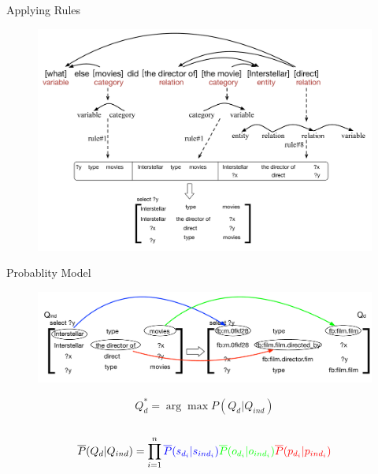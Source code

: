 \documentclass{beamer}
\begin{document}
\begin{frame}{Applying Rules}
	\begin{figure}
		\centering\includegraphics[width=1.0\textwidth]{introduction/graphUsingRules.pdf}
	\end{figure}
\end{frame}

\begin{frame}{Probablity Model}
	\begin{figure}
		\centering\includegraphics[width=1.0\textwidth]{introduction/grounding.pdf}
	\end{figure}
	$$Q^*_{d} = \arg\max P(Q_{d}|Q_{ind})$$ \\ \pause
	$$ \overline{P}(Q_{d}|Q_{ind})  =  \prod_{i=1}^n \textcolor{blue}{\overline{P}(s_{d_{i}} |s_{ind_{i}})} \textcolor{green}{\overline{P}(o_{d_{i}} |o_{ind_{i}})}  \textcolor{red}{\overline{P}(p_{d_{i}} |p_{ind_{i}})} $$
\end{frame}
\end{document}

